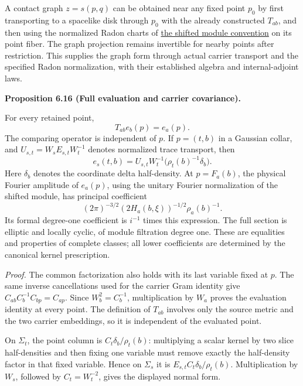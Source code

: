 \documentclass[
  english,
  11pt,
  reqno]{amsart}
\makeatletter
\newcommand{\pandocstatementheading}[1]{%
  \par\if@nobreak\else
    \addpenalty{\@beginparpenalty}%
    \addvspace{.5\baselineskip plus .2\baselineskip minus .2\baselineskip}%
  \fi
  {\normalfont\bfseries #1\par}%
  \nobreak\@afterindenttrue\@afterheading
}
\makeatother
\begin{document}
A contact graph \(z=s(p,q)\) can be obtained near any fixed point
\(p_0\) by first transporting to a spacelike disk through \(p_0\) with
the already constructed \(T_{ab}\), and then using the normalized Radon
charts of \hyperref[prop:online-shifted-sky-modules]{the shifted module
convention} on its point fiber. The graph projection remains invertible
for nearby points after restriction. This supplies the graph form
through actual carrier transport and the specified Radon normalization,
with their established algebra and internal-adjoint laws.

\pandocstatementheading{\leavevmode{}\label{prop:online-wave-full-evaluation-comparison}Proposition 6.16 (Full evaluation and carrier covariance).}

For every retained point,%
 \[
T_{ab}e_b(p)=e_a(p).
\] The comparing operator is independent of \(p\). If \(p=(t,b)\) in a
Gaussian collar, and \(U_{s,t}=W_sE_{s,t}W_t^{-1}\) denotes normalized
trace transport, then%
 \[
e_s(t,b)
=U_{s,t}W_t^{-1}
  \bigl(\rho_t(b)^{-1}\delta_b\bigr).
\] Here \(\delta_b\) denotes the coordinate delta half-density. At
\(p=F_a(b)\), the physical Fourier amplitude of \(e_a(p)\), using the
unitary Fourier normalization of the shifted module, has principal
coefficient%
 \[
(2\pi)^{-3/2}(2H_a(b,\xi))^{-1/2}\rho_a(b)^{-1}.
\] Its formal degree-one coefficient is \(i^{-1}\) times this
expression. The full section is elliptic and locally cyclic, of module
filtration degree one. These are equalities and properties of complete
classes; all lower coefficients are determined by the canonical kernel
prescription.

\emph{Proof.} The common factorization also holds with its last variable
fixed at \(p\). The same inverse cancellations used for the carrier Gram
identity give \(C_{ab}C_b^{-1}C_{bp}=C_{ap}\). Since \(W_b^2=C_b^{-1}\),
multiplication by \(W_a\) proves the evaluation identity at every point.
The definition of \(T_{ab}\) involves only the source metric and the two
carrier embeddings, so it is independent of the evaluated point.

On \(\Sigma_t\), the point column is \(C_t\delta_b/\rho_t(b)\):
multiplying a scalar kernel by two slice half-densities and then fixing
one variable must remove exactly the half-density factor in that fixed
variable. Hence on \(\Sigma_s\) it is \(E_{s,t}C_t\delta_b/\rho_t(b)\).
Multiplication by \(W_s\), followed by \(C_t=W_t^{-2}\), gives the
displayed normal form.
\end{document}
